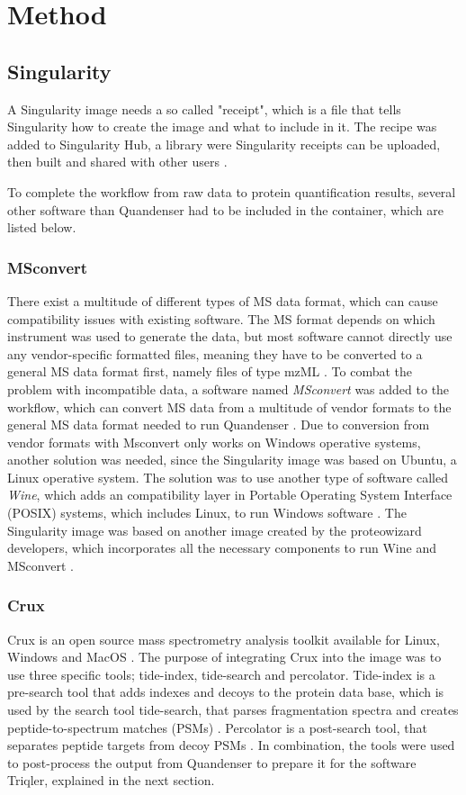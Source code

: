 \section{Method}

\subsection{Singularity}
A Singularity image needs a so called "receipt", which is a file that tells Singularity how to create the image and what to include in it. The recipe was added to Singularity Hub, a library were Singularity receipts can be uploaded, then built and shared with other users \cite{singularity-hub}.

To complete the workflow from raw data to protein quantification results, several other software than Quandenser had to be included in the container, which are listed below.

\subsubsection{MSconvert}
There exist a multitude of different types of MS data format, which can cause compatibility issues with existing software. The MS format depends on which instrument was used to generate the data, but most software cannot directly use any vendor-specific formatted files, meaning they have to be converted to a general MS data format first, namely files of type mzML \cite{mzml-format}. To combat the problem with incompatible data, a software named \textit{MSconvert} was added to the workflow, which can convert MS data from a multitude of vendor formats to the general MS data format needed to run Quandenser \cite{proteowizard}. Due to conversion from vendor formats with Msconvert only works on Windows operative systems, another solution was needed, since the Singularity image was based on Ubuntu, a Linux operative system. The solution was to use another type of software called \textit{Wine}, which adds an compatibility layer in Portable Operating System Interface (POSIX) systems, which includes Linux, to run Windows software \cite{wine}. The Singularity image was based on another image created by the proteowizard developers, which incorporates all the necessary components to run Wine and MSconvert \cite{docker-image} \cite{docker-howto}.

\subsubsection{Crux}
Crux is an open source mass spectrometry analysis toolkit available for Linux, Windows and MacOS \cite{crux}. The purpose of integrating Crux into the image was to use three specific tools; tide-index, tide-search and percolator. Tide-index is a pre-search tool that adds indexes and decoys to the protein data base, which is used by the search tool tide-search, that parses fragmentation spectra and creates peptide-to-spectrum matches (PSMs) \cite{tide-search}. Percolator is a post-search tool, that separates peptide targets from decoy PSMs \cite{percolator}. In combination, the tools were used to post-process the output from Quandenser to prepare it for the software Triqler, explained in the next section.


